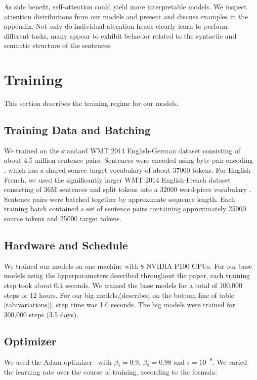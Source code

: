 \documentclass{article}
\begin{document}
As side benefit, self-attention could yield more interpretable models. We inspect attention distributions from our models and present and discuss examples in the appendix. Not only do individual attention heads clearly learn to perform different tasks, many appear to exhibit behavior related to the syntactic and semantic structure of the sentences.

\section{Training}
This section describes the training regime for our models. 

\subsection{Training Data and Batching}
We trained on the standard WMT 2014 English-German dataset consisting of about 4.5 million sentence pairs.  Sentences were encoded using byte-pair encoding \citep{DBLP:journals/corr/BritzGLL17}, which has a shared source-target vocabulary of about 37000 tokens. For English-French, we used the significantly larger WMT 2014 English-French dataset consisting of 36M sentences and split tokens into a 32000 word-piece vocabulary \citep{wu2016google}.  Sentence pairs were batched together by approximate sequence length.  Each training batch contained a set of sentence pairs containing approximately 25000 source tokens and 25000 target tokens.  

\subsection{Hardware and Schedule}

We trained our models on one machine with 8 NVIDIA P100 GPUs.  For our base models using the hyperparameters described throughout the paper, each training step took about 0.4 seconds.  We trained the base models for a total of 100,000 steps or 12 hours.  For our big models,(described on the bottom line of table \ref{tab:variations}), step time was 1.0 seconds.  The big models were trained for 300,000 steps (3.5 days).

\subsection{Optimizer} We used the Adam optimizer~\citep{kingma2014adam} with $\beta_1=0.9$, $\beta_2=0.98$ and $\epsilon=10^{-9}$.  We varied the learning rate over the course of training, according to the formula:
\end{document}
